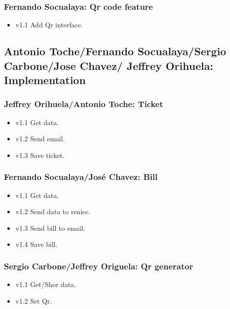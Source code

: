 \documentclass{article}
\begin{document}
\subsubsection{Fernando Socualaya: Qr code feature}
\begin{itemize}
\item v1.1 Add Qr interface.
\end{itemize}

 \subsection{Antonio Toche/Fernando Socualaya/Sergio Carbone/Jose Chavez/ Jeffrey Orihuela: Implementation}
 \blindtext
\subsubsection{Jeffrey Orihuela/Antonio Toche: Ticket}
\begin{itemize}
\item v1.1 Get data.
\item v1.2 Send email.
\item v1.3 Save ticket.
\end{itemize}


\subsubsection{Fernando Socualaya/José Chavez: Bill}
\begin{itemize}
\item v1.1 Get data.
\item v1.2 Send data to reniec.
\item v1.3 Send bill to email.
\item v1.4 Save bill.
\end{itemize}

\subsubsection{Sergio Carbone/Jeffrey Origuela: Qr generator}
\begin{itemize}
\item v1.1 Get/Shor data.
\item v1.2 Set Qr.
\end{itemize}
\end{document}
